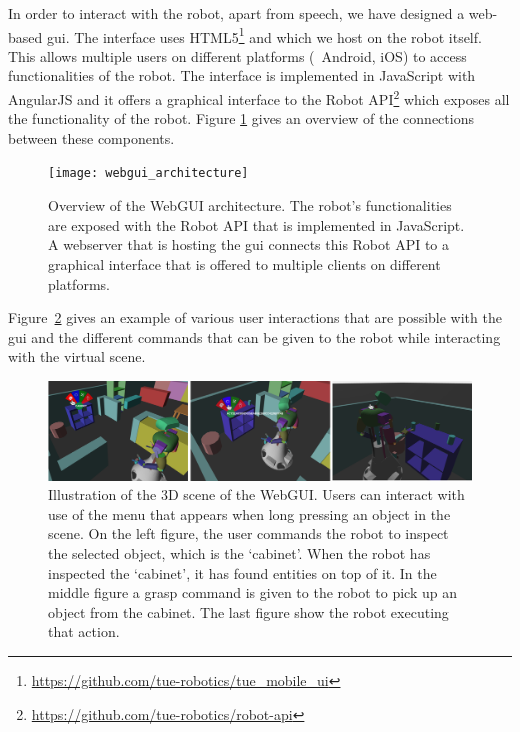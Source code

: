 \label{ssec:webgui}
In order to interact with the robot, apart from speech, we have designed a web-based \gls{gui}. The interface uses
HTML5\footnote{\url{https://github.com/tue-robotics/tue_mobile_ui}} and which we host on the robot itself.
This allows multiple users on different platforms (\eg\ Android, iOS) to access functionalities of the robot. The interface is implemented in JavaScript with AngularJS and it offers a graphical interface to the Robot API\footnote{\url{https://github.com/tue-robotics/robot-api}} which exposes all the functionality of the robot.
Figure \ref{fig:webgui_architecture} gives an overview of the connections between these components.
\begin{figure}[h]
    \centering
	\texttt{[image: webgui\_architecture]}
	\caption{
		Overview of the WebGUI architecture.
		The robot's functionalities are exposed with the Robot API that is implemented in JavaScript.
		A webserver that is hosting the \protect\gls{gui} connects this Robot API to a graphical interface that is offered to multiple clients on different platforms.}
	\label{fig:webgui_architecture}
\end{figure}
Figure~\ref{fig:gui_actions} gives an example of various user interactions that are possible with the \gls{gui} and the different commands that can be given to the robot while interacting with the virtual scene.

\begin{figure}[H]
	\includegraphics[width=\linewidth]{Figures/gui_actions}
	\caption{
		Illustration of the 3D scene of the WebGUI.
		Users can interact with use of the menu that appears when long pressing an object in the scene.
		On the left figure, the user commands the robot to inspect the selected object, which is the `cabinet'.
		When the robot has inspected the `cabinet', it has found entities on top of it.
		In the middle figure a grasp command is given to the robot to pick up an object from the cabinet.
		The last figure show the robot executing that action.}
	\label{fig:gui_actions}
\end{figure}
